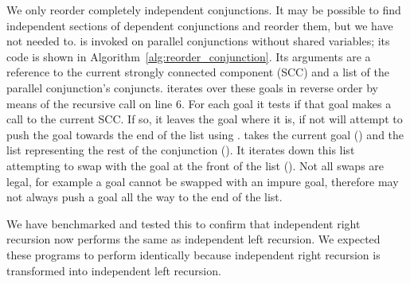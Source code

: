 We only reorder completely independent conjunctions.
It may be possible to find independent sections of dependent conjunctions
and reorder them,
but we have not needed to.
\reorder is invoked on parallel conjunctions without shared variables;
its code is shown in Algorithm~\ref{alg:reorder_conjunction}.
Its arguments are a reference to the current strongly connected component (SCC)
and a list of the parallel conjunction's conjuncts.
\reorder iterates over these goals in reverse order by means of the
recursive call on line 6.
For each goal it tests if that goal makes a call to the current SCC.
If so, it leaves the goal where it is,
if not \reorder will attempt to push the goal towards the end of the
list using \trypushconjlater.
\trypushconjlater takes the current goal () and the list
representing the rest of the conjunction ().
It iterates down this list attempting to swap  with the goal at
the front of the list ().
Not all swaps are legal,
for example a goal cannot be swapped with an impure goal,
therefore \trypushconjlater may not always push a goal all the way to the
end of the list.

We have benchmarked and tested this to confirm that independent right recursion
now performs the same as independent left recursion.
We expected these programs to perform identically
because independent right recursion is transformed into independent
left recursion.



